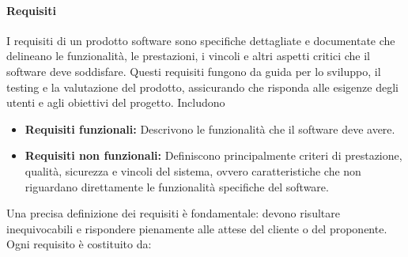 \paragraph{Requisiti}
I requisiti di un prodotto software sono specifiche dettagliate e documentate che delineano le funzionalità, le prestazioni, i vincoli e altri aspetti critici che il software deve soddisfare. Questi requisiti fungono da guida per lo sviluppo, il testing e la valutazione del prodotto, assicurando che risponda alle esigenze degli utenti e agli obiettivi del progetto.
Includono
\begin{itemize}
    \item \textbf{Requisiti funzionali:} Descrivono le funzionalità che il software deve avere.
    \item \textbf{Requisiti non funzionali:} Definiscono principalmente criteri di prestazione, qualità, sicurezza e vincoli del sistema, ovvero caratteristiche che non riguardano direttamente le funzionalità specifiche del software.
\end{itemize}
Una precisa definizione dei requisiti è fondamentale: devono risultare inequivocabili e rispondere pienamente alle attese del cliente o del proponente.\\
Ogni requisito è costituito da:
